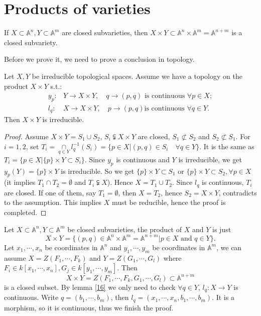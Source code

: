 \section{Products of varieties}
\begin{theorem}\label{15}
	If $ X\subset \mathbb{A}^n,Y\subset \mathbb{A}^m $ are closed subvarieties, then $ X\times Y\subset \mathbb{A}^n\times \mathbb{A}^m=\mathbb{A}^{n+m} $ is a closed subvariety.
\end{theorem}
Before we prove it, we need to prove a conclusion in topology.
\begin{lemma}\label{16}
	Let $ X,Y $ be irreducible topological spaces. Assume we have a topology on the product $ X\times Y $ s.t.:
	\begin{align*}
		y_p: & Y\to X\times Y, \quad q\to (p,q) \text{ is continuous }\forall p\in X; \\
		l_q: & X\to X\times Y, \quad p\to (p,q) \text{is continuous }\forall q\in Y.
	\end{align*}
	Then $ X\times Y $ is irreducible.
\end{lemma}
\begin{proof}
	Assume $ X\times Y=S_1\cup S_2 $, $ S_i\subsetneqq X\times Y $ are closed, $S_1\not\subset S_2$ and $S_2\not\subset S_1$. For $ i=1,2 $, set $ T_i=\mathop{\cap}\limits_{q\in Y}l_q^{-1}(S_i)=\{ p\in X|(p,q)\in S_i \quad\forall q\in Y \} $. It is the same as $ T_i=\{ p\in X|\{ p \}\times Y\subset S_i \} $. Since $ y_p $ is continuous and $ Y $ is irreducible, we get $ y_p(Y)=\{p\}\times Y $ is irreducible. So we get $ \{p\}\times Y\subset S_1 $ or $ \{p\}\times Y\subset S_2 ,\forall p\in X$(it implies $ T_1\cap T_2=\emptyset $ and $ T_i\subsetneqq X $). Hence $ X=T_1\cup T_2 $. Since $ l_q $ is continuous, $ T_i $ are closed. If one of them, say $T_1=\emptyset$, then $X=T_2$, hence $S_2 = X\times Y$, contradicts to the assumption.  This implies $ X $ must be  reducible, hence the proof is completed.
\end{proof}
\begin{proofofproductsofaffinevarieties}
	Let $ X\subset \mathbb{A}^n,Y\subset \mathbb{A}^m $ be closed subvarieties, the product of $ X $ and $ Y $ is just
	$$
		X\times Y=\{ (p,q)\in \mathbb{A}^n\times \mathbb{A}^m=\mathbb{A}^{n+m}|p\in X \text{ and }q\in Y \}.
	$$
	Let $ x_1,\cdots,x_n $ be coordinates in $ \mathbb{A}^n $ and $ y_1,\cdots,y_m $ be coordinates in $ \mathbb{A}^m $, we can assume $ X=Z(F_1,\cdots,F_k) $ and $ Y=Z(G_1,\cdots,G_l) $ where $ F_i\in k[x_1,\cdots,x_n],G_j\in k[y_1,\cdots,y_m] $. Then
	\begin{equation}
		X\times Y= Z(F_1,\cdots,F_k,G_1,\cdots,G_l)\subset \mathbb{A}^{n+m}
	\end{equation}
	is a closed subset. By lemma \ref{16} we only need to check  $\forall  q\in Y $, $ l_q:X\to Y $ is continuous. Write $ q=(b_1,\cdots,b_m) $, then $ l_q=(x_1,\cdots,x_n,b_1,\cdots,b_m) $. It is a morphism, so it is continuous, thus we finish the proof.
\end{proofofproductsofaffinevarieties}
